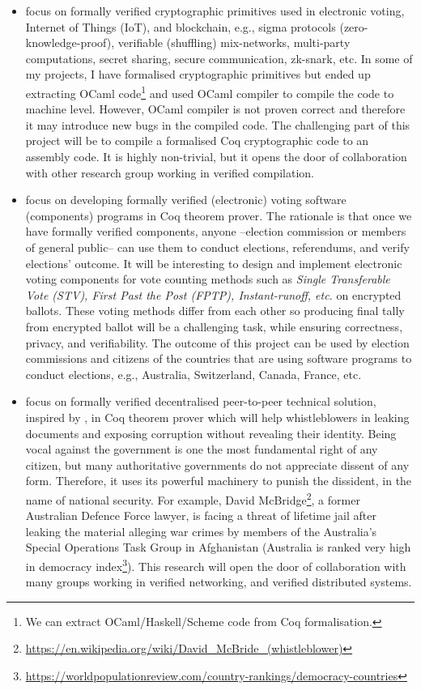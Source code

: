 \documentclass[a4paper]{article}
\begin{document}
\begin{itemize}



\item focus on formally verified cryptographic primitives used in electronic voting, 
  Internet of Things (IoT), and blockchain, e.g., 
	sigma protocols (zero-knowledge-proof), verifiable (shuffling) mix-networks, 
	multi-party computations, secret sharing, secure communication, zk-snark, etc. 
	In some of my projects, I have formalised
	cryptographic primitives but ended up extracting OCaml 
	code\footnote{We can extract OCaml/Haskell/Scheme 
	code from Coq formalisation.} and used OCaml compiler to 
	compile the code to machine level. However, OCaml compiler is not proven correct 
	and therefore it may introduce new bugs in the compiled code. The challenging part 
	of this project will be to compile a formalised Coq cryptographic 
	code to an assembly code. It is highly non-trivial, but it opens the door of 
	collaboration with other research group working in verified compilation.

\item focus on developing formally verified (electronic) voting 
software (components) programs in Coq theorem prover. 
The rationale is that once we have formally verified 
components, anyone --election commission or members of general public-- can use them 
to conduct elections, referendums, and verify elections' outcome.
It will be interesting to design and implement electronic voting components  
for vote counting methods such as \textit{Single Transferable Vote (STV), 
First Past the Post (FPTP), Instant-runoff, etc.} on encrypted ballots. These 
voting methods differ from each other so producing final tally from encrypted 
ballot will be a challenging task, while ensuring correctness, privacy, and 
verifiability. The outcome of this project can be used by election commissions and citizens of 
the countries that are using software programs to conduct elections, e.g.,
Australia, Switzerland, Canada, France, etc. 

\item focus on formally verified decentralised peer-to-peer technical solution, inspired by 
\cite{liu2004linkable, Clarke2001, schimmer2009peer}, in Coq theorem prover which will help 
whistleblowers in leaking documents and exposing corruption without revealing their identity. 
Being vocal against the government is one the most fundamental right of any citizen, but many 
authoritative governments do not appreciate dissent of any form. Therefore, it uses 
its powerful machinery to punish the dissident, in the name of national security. 
For example, David McBridge\footnote{\url{https://en.wikipedia.org/wiki/David_McBride_(whistleblower)}}, 
a former Australian Defence Force lawyer,  
is facing a threat of lifetime jail after
leaking the material alleging war crimes by members of the Australia's Special Operations
Task Group in Afghanistan (Australia is ranked very high in 
democracy index\footnote{\url{https://worldpopulationreview.com/country-rankings/democracy-countries}}). 
This research will open the door of collaboration with many groups working in verified 
networking, and verified distributed systems. 


\end{itemize}
\end{document}
